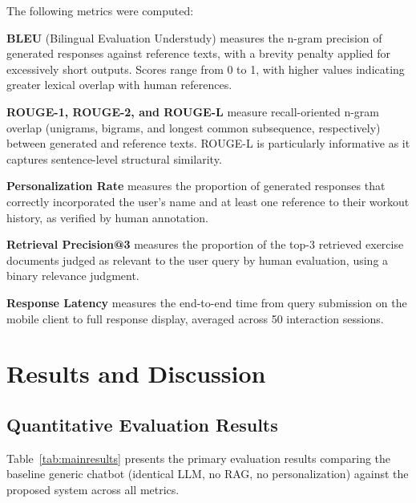 \documentclass[conference]{IEEEtran}
\begin{document}
The following metrics were computed:

\textbf{BLEU} (Bilingual Evaluation Understudy) \cite{papineni2002bleu} measures the n-gram precision of generated responses against reference texts, with a brevity penalty applied for excessively short outputs. Scores range from 0 to 1, with higher values indicating greater lexical overlap with human references.

\textbf{ROUGE-1, ROUGE-2, and ROUGE-L} \cite{lin2004rouge} measure recall-oriented n-gram overlap (unigrams, bigrams, and longest common subsequence, respectively) between generated and reference texts. ROUGE-L is particularly informative as it captures sentence-level structural similarity.

\textbf{Personalization Rate} measures the proportion of generated responses that correctly incorporated the user's name and at least one reference to their workout history, as verified by human annotation.

\textbf{Retrieval Precision@3} measures the proportion of the top-3 retrieved exercise documents judged as relevant to the user query by human evaluation, using a binary relevance judgment.

\textbf{Response Latency} measures the end-to-end time from query submission on the mobile client to full response display, averaged across 50 interaction sessions.

\section{Results and Discussion}

\subsection{Quantitative Evaluation Results}

Table~\ref{tab:mainresults} presents the primary evaluation results comparing the baseline generic chatbot (identical LLM, no RAG, no personalization) against the proposed system across all metrics.
\end{document}

